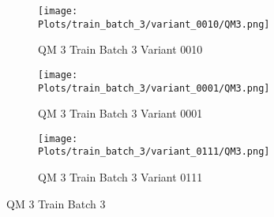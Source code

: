 \documentclass{DissertateFigs}
\begin{document}
\begin{figure}[t!]
\medskip

    \begin{subfigure}{0.47\textwidth}
    \texttt{[image: Plots/train\_batch\_3/variant\_0010/QM3.png]}
    \caption{QM 3 Train Batch 3 Variant 0010}
    \end{subfigure}
    \begin{subfigure}{0.47\textwidth}
    \texttt{[image: Plots/train\_batch\_3/variant\_0001/QM3.png]}
    \caption{QM 3 Train Batch 3 Variant 0001}
    \end{subfigure}

\medskip

    \begin{subfigure}{0.47\textwidth}
    \texttt{[image: Plots/train\_batch\_3/variant\_0111/QM3.png]}
    \caption{QM 3 Train Batch 3 Variant 0111}
    \end{subfigure}
\caption{QM 3 Train Batch 3}
    \end{figure}
\clearpage
\end{document}
